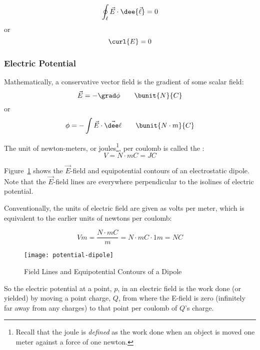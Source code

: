 \begin{equation}
\oint_\ell \vec{E}\cdot\dee{\vec{\ell}} = 0
\end{equation}
or
\begin{equation}
\curl{E} = 0
\end{equation}

\subsubsection{Electric Potential}

Mathematically, a conservative vector field is the gradient of some
scalar field:
\begin{equation}
\vec{E} = -\grad\phi \qquad\bunit{N}{C}
\end{equation}
or
\begin{equation}
\phi = -\int \vec{E}\cdot\vec{\dee\ell} \qquad\bunit{N\cdot m}{C}
\end{equation}

The unit of newton-meters, or joules\footnote{Recall that the joule is
  \emph{defined} as the work done when an object is moved one meter
  against a force of one newton.}, per coulomb is called the
:
\begin{equation}
V = \unit{N\cdot m}{C} = \unit{J}{C}
\end{equation}

Figure~\ref{fig:dipole} shows the $\vec{E}$-field and equipotential
contours of an electrostatic dipole. Note that the $\vec{E}$-field
lines are everywhere perpendicular to the isolines of electric
potential.

Conventionally, the units of electric field are given as volts per
meter, which is equivalent to the earlier units of newtons per
coulomb:

\begin{equation}
\unit{V}{m} = \frac{\unit{N\cdot m}{C}}{\unit{m}} = \unit{N\cdot m}{C}\cdot\unit{1}{m} = \unit{N}{C}
\end{equation}

\begin{figure}[ht]
  \centering
  \texttt{[image: potential-dipole]}
  \caption{Field Lines and Equipotential Contours of a Dipole}
  \label{fig:dipole}
\end{figure}

So the electric potential at a point, $p$, in an electric field is the
work done (or yielded) by moving a point charge, $Q$, from where the
E-field is zero (infinitely far away from any charges) to that point
per coulomb of $Q$'s charge.

